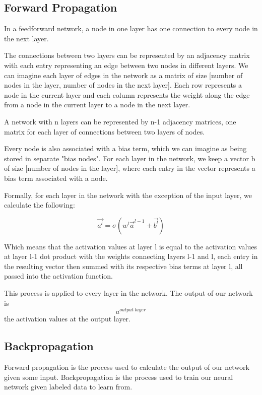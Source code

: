 \documentclass[11pt,onecolumn]{article} %
\begin{document}
	
	\subsection{Forward Propagation}
	
	In a feedforward network, a node in one layer has one connection to every node in the next layer.
	
	The connections between two layers can be represented by an adjacency matrix with each entry representing an edge between two nodes in different layers. We can imagine each layer of edges in the network as a matrix of size [number of nodes in the layer, number of nodes in the next layer]. Each row represents a node in the current layer and each column represents the weight along the edge from a node in the current layer to a node in the next layer.
	
	A network with n layers can be represented by n-1 adjacency matrices, one matrix for each layer of connections between two layers of nodes.
	
	Every node is also associated with a bias term, which we can imagine as being stored in separate "bias nodes". For each layer in the network, we keep a vector b of size [number of nodes in the layer], where each entry in the vector represents a bias term associated with a node.
	
	Formally, for each layer in the network with the exception of the input layer, we calculate the following:
	
	\[ \vec{a^l} = \sigma (w^l\vec{a}^{l-1} + \vec{b^l}) \]
	
	Which means that the activation values at layer l is equal to the activation values at layer l-1 dot product with the weights connecting layers l-1 and l, each entry in the resulting vector then summed with its respective bias terms at layer l, all passed into the activation function.
	
	This process is applied to every layer in the network. The output of our network is \[a^{output\ layer}\] the activation values at the output layer.
	
	
	
	\subsection{Backpropagation}
	
	Forward propagation is the process used to calculate the output of our network given some input. Backpropagation is the process used to train our neural network given labeled data to learn from.
	
\end{document}
